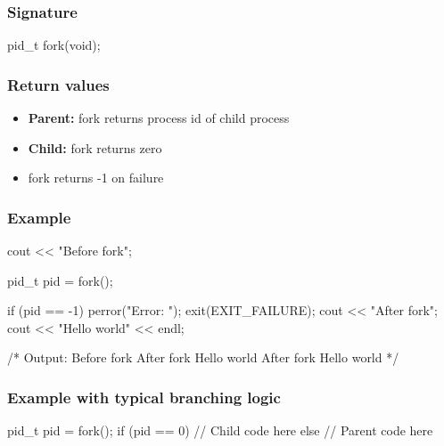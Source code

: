 \documentclass{report}
\begin{document}
        \subsubsection{Signature}
        \bigbreak \noindent 
        \begin{cppcode}
            pid_t fork(void);
        \end{cppcode}
        \bigbreak \noindent 
        \subsubsection{Return values}
        \bigbreak \noindent 
        \begin{itemize}
            \item \textbf{Parent:} fork returns process id of child process
            \item \textbf{Child:} fork returns zero
            \item fork returns -1 on failure
        \end{itemize}
        
        \bigbreak \noindent 
        \subsubsection{Example}
        \bigbreak \noindent 
        \begin{cppcode}
            cout << "Before fork\n";

            pid_t pid = fork();

            if (pid == -1) {
                perror("Error: ");
                exit(EXIT_FAILURE);
            }
            cout << "After fork\n";
            cout << "Hello world" << endl;

            /* Output:
                Before fork
                After fork
                Hello world
                After fork
                Hello world
            */
        \end{cppcode}
        \bigbreak \noindent 

        \bigbreak \noindent 
        \subsubsection{Example with typical branching logic}
        \bigbreak \noindent 
        \begin{cppcode}
           pid_t pid = fork();
           if (pid == 0) {
               // Child code here
           } else {
               // Parent code here
           }
        \end{cppcode}
\end{document}
